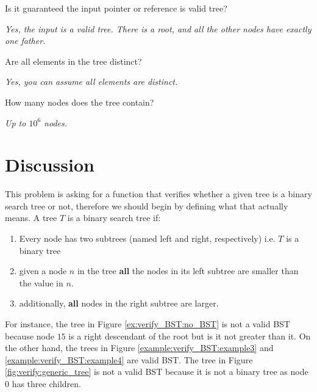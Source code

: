\begin{QandA}
	\begin{questionitem} \begin{question} Is it guaranteed the input pointer or reference is valid tree?  \end{question} 	 
    \begin{answered}
		\textit{Yes, the input is a valid tree. There is a root, and all the other nodes have exactly one father.}
	\end{answered} \end{questionitem}
	\begin{questionitem} \begin{question} Are all elements in the tree distinct?  \end{question} 	 
    \begin{answered}
		\textit{Yes, you can assume all elements are distinct.}
	\end{answered} \end{questionitem}
	\begin{questionitem} \begin{question} How many nodes does the tree contain?  \end{question} 	 
    \begin{answered}
		\textit{Up to $10^6$ nodes.}
	\end{answered} \end{questionitem}
\end{QandA}

\section{Discussion}
\label{verify_BST:sec:discussion}
This problem is asking for a function that verifies whether a given tree is a binary search tree or not, therefore we should begin by defining what that actually means.
A tree $T$ is a binary search tree if:
\begin{enumerate}
	\item Every node has two subtrees (named left and right, respectively) i.e. $T$ is a binary tree
	\item given a node $n$ in the tree \textbf{all} the nodes in its left subtree are smaller than the value in $n$.
	\item additionally,  \textbf{all} nodes in the right subtree are larger.
\end{enumerate}
For instance, the tree in Figure \ref{ex:verify_BST:no_BST} is not a valid BST because node $15$ is a right descendant of the root but is it not greater than it. On the other hand, the trees in Figure \ref{example:verify_BST:example3} and \ref{example:verify_BST:example4} are valid BST. The tree in Figure \ref{fig:verify:generic_tree} is not a valid BST because it is not a binary tree as node $0$ has three children.

